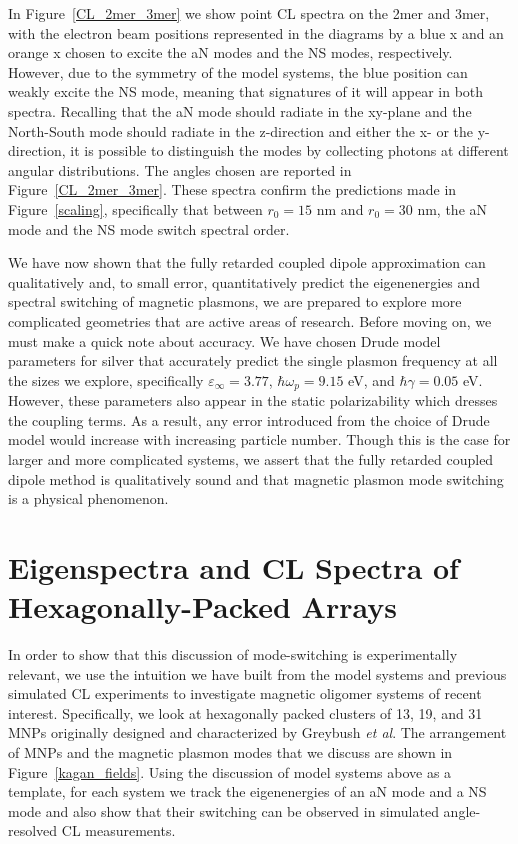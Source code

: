 \documentclass[journal=apchd5,manuscript=article]{achemso}
\begin{document}
In Figure~\ref{CL_2mer_3mer} we show point CL spectra on the 2mer and 3mer, with the electron beam positions represented in the diagrams by a blue x and  an orange x chosen to excite the aN modes and the NS modes, respectively. However, due to the symmetry of the model systems, the blue position can weakly excite the NS mode, meaning that signatures of it will appear in both spectra. Recalling that the aN mode should radiate in the xy-plane and the North-South mode should radiate in the z-direction and either the x- or the y- direction, it is possible to distinguish the modes by collecting photons at different angular distributions. The angles chosen are reported in Figure~\ref{CL_2mer_3mer}. These spectra confirm the predictions made in Figure~\ref{scaling}, specifically that between $r_0 = 15$ nm and $r_0 = 30$ nm, the aN mode and the NS mode switch spectral order.

We have now shown that the fully retarded coupled dipole approximation can qualitatively and, to small error, quantitatively predict the eigenenergies and spectral switching of magnetic plasmons, we are prepared to explore more complicated geometries that are active areas of research. Before moving on, we must make a quick note about accuracy. We have chosen Drude model parameters for silver that accurately predict the single plasmon frequency at all the sizes we explore, specifically $\varepsilon_{\infty} = 3.77$, $\hbar\omega_p = 9.15$ eV, and $\hbar\gamma = 0.05$ eV. However, these parameters also appear in the static polarizability which dresses the coupling terms. As a result, any error introduced from the choice of Drude model would increase with increasing particle number. Though this is the case for larger and more complicated systems, we assert that the fully retarded coupled dipole method is qualitatively sound and that magnetic plasmon mode switching is a physical phenomenon.

\section{Eigenspectra and CL Spectra of Hexagonally-Packed Arrays}

In order to show that this discussion of mode-switching is experimentally relevant, we use the intuition we have built from the model systems and previous simulated CL experiments to investigate magnetic oligomer systems of recent interest. Specifically, we look at hexagonally packed clusters of 13, 19, and 31 MNPs originally designed and characterized by Greybush \textit{et al}\cite{Engheta2017}. The arrangement of MNPs and the magnetic plasmon modes that we discuss are shown in Figure~\ref{kagan_fields}. Using the discussion of model systems above as a template, for each system we track the eigenenergies of an aN mode and a NS mode and also show that their switching can be observed in simulated angle-resolved CL measurements.
\end{document}
